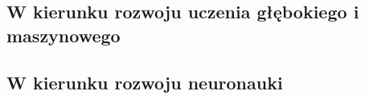 \subsection{W kierunku rozwoju uczenia głębokiego i maszynowego}

\subsection{W kierunku rozwoju neuronauki}

